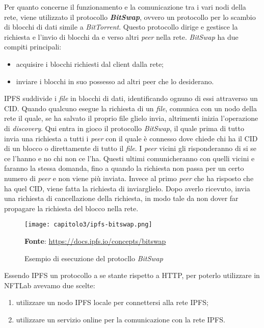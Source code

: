 Per quanto concerne il funzionamento e la comunicazione tra i vari nodi della rete, viene utilizzato il protocollo \textbf{\textit{BitSwap}}, ovvero un protocollo per lo scambio di blocchi di dati simile a \textit{BitTorrent}.
Questo protocollo dirige e gestisce la richiesta e l'invio di blocchi da e verso altri \textit{peer} nella rete. \textit{BitSwap} ha due compiti principali: 
\begin{itemize}
  \item acquisire i blocchi richiesti dal client dalla rete;
  \item inviare i blocchi in suo possesso ad altri peer che lo desiderano.
\end{itemize}

IPFS suddivide i \textit{file} in blocchi di dati, identificando ognuno di essi attraverso un CID. Quando qualcuno esegue la richiesta di un \textit{file}, comunica con un nodo della rete il quale, se ha salvato il proprio file glielo invia, altrimenti inizia l'operazione di \textit{discovery}. Qui entra in gioco il protocollo \textit{BitSwap}, il quale prima di tutto invia una richiesta a tutti i \textit{peer} con il quale è connesso dove chiede chi ha il CID di un blocco o direttamente di tutto il \textit{file}. I \textit{peer} vicini gli risponderanno di si se ce l'hanno e no chi non ce l'ha. Questi ultimi comunicheranno con quelli vicini e faranno la stessa domanda, fino a quando la richiesta non passa per un certo numero di \textit{peer} e non viene più inviata. Invece al primo \textit{peer} che ha risposto che ha quel CID, viene fatta la richiesta di inviarglielo. Dopo averlo ricevuto, invia una richiesta di cancellazione della richiesta, in modo tale da non dover far propagare la richiesta del blocco nella rete.

\clearpage

\begin{figure}[h!]
  \centering
  \texttt{[image: capitolo3/ipfs-bitswap.png]}
  \caption{Esempio di esecuzione del protocllo \textit{BitSwap}}
  \textbf{Fonte}: \href{https://docs.ipfs.io/concepts/bitswap}{https://docs.ipfs.io/concepts/bitswap}
\end{figure}

Essendo IPFS un protocollo a se stante rispetto a HTTP, per poterlo utilizzare in NFTLab avevamo due scelte:
\begin{enumerate}
  \item utilizzare un nodo IPFS locale per connettersi alla rete IPFS;
  \item utilizzare un servizio online per la comunicazione con la rete IPFS.
\end{enumerate}

